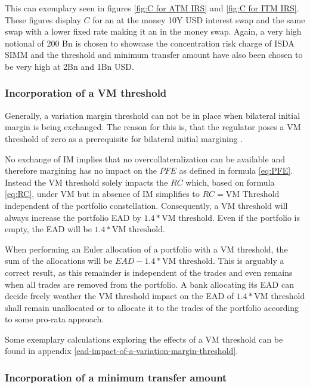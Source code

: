\documentclass[../Thesis_AHoecherl.tex]{subfiles}
\begin{document}
    This can exemplary seen in figures \ref{fig:C for ATM IRS} and \ref{fig:C for ITM IRS}. These figures display $C$ for an at the money 10Y USD interest swap and the same swap with a lower fixed rate making it an in the money swap. Again, a very high notional of 200 Bn is chosen to showcase the concentration risk charge of \gls{ISDA SIMM} and the threshold and minimum transfer amount have also been chosen to be very high at 2Bn and 1Bn USD.

    \subsubsection{Incorporation of a VM threshold\label{sec:Incorporation of a VM threshold}}
    
    Generally, a variation margin threshold can not be in place when bilateral initial margin is being exchanged. The reason for this is, that the regulator poses a \gls{VM} threshold of zero as a prerequisite for bilateral initial margining \cite[Requirement 2.1]{BCBS_MarginRequirements}.

    No exchange of \gls{IM} implies that no overcollateralization can be available and therefore margining has no impact on the $PFE$ as defined in formula \ref{eq:PFE}. Instead the \gls{VM} threshold solely impacts the $RC$ which, based on formula \ref{eq:RC}, under \gls{VM} but in absence of \gls{IM} simplifies to $RC = \text{VM Threshold}$ independent of the portfolio constellation. 
    Consequently, a \gls{VM} threshold will always increase the portfolio \gls{EAD} by $1.4*\text{VM threshold}$. Even if the portfolio is empty, the \gls{EAD} will be $1.4 * \text{VM threshold}$.

    When performing an Euler allocation of a portfolio with a \gls{VM} threshold, the sum of the allocations will be $EAD - 1.4 * \text{VM threshold}$. This is arguably a correct result, as this remainder is independent of the trades and even remains when all trades are removed from the portfolio. 
    A bank allocating its \gls{EAD} can decide freely weather the \gls{VM} threshold impact on the \gls{EAD} of $1.4 * \text{VM threshold}$ shall remain unallocated or to allocate it to the trades of the portfolio according to some pro-rata approach.

    Some exemplary calculations exploring the effects of a \gls{VM} threshold can be found in appendix \ref{ead-impact-of-a-variation-margin-threshold}.
    
    \subsubsection{Incorporation of a minimum transfer amount}\label{sec:Incorporation of a minimum transfer amount}
\end{document}
